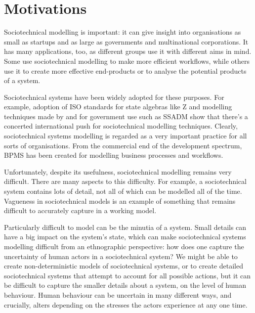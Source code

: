 \chapter{Motivations}
\label{motivations}
Sociotechnical modelling is important: it can give insight into organisations as small as startups and as large as governments and multinational corporations. It has many applications, too, as different groups use it with different aims in mind. Some use sociotechnical modelling to make more efficient workflows\cite{Aalst2002}, while others use it to create more effective end-products or to analyse the potential products of a system. \par

Sociotechnical systems have been widely adopted for these purposes. For example, adoption of ISO standards for state algebras like Z\cite{ZStandardsPanel2000} and modelling techniques made by and for government use such as SSADM show that there's a concerted international push for sociotechnical modelling techniques. Clearly, sociotechnical systems modelling is regarded as a very important practice for all sorts of organisations. From the commercial end of the development spectrum, BPMS has been created for modelling business processes and workflows\cite{bpmsSpec}. \par%

Unfortunately, despite its usefulness, sociotechnical modelling remains very difficult. There are many aspects to this difficulty. For example, a sociotechnical system contains lots of detail, not all of which can be modelled all of the time. Vagueness in sociotechnical models is an example of something that remains difficult to accurately capture in a working model\cite{Herrmann1999}.\par

Particularly difficult to model can be the minutia of a system. Small details can have a big impact on the system's state\cite{Crabtree2000}, which can make sociotechnical systems modelling difficult from an ethnographic perspective: how does one capture the uncertainty of human actors in a sociotechnical system? We might be able to create non-deterministic models of sociotechnical systems, or to create detailed sociotechnical systems that attempt to account for all possible actions, but it can be difficult to capture the smaller details about a system, on the level of human behaviour. Human behaviour can be uncertain in many different ways, and crucially, alters depending on the stresses the actors experience at any one time. \par

